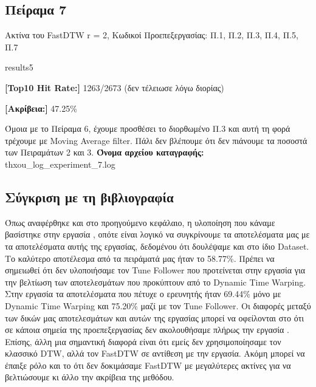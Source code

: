 \subsection{Πείραμα 7}
Ακτίνα του FastDTW r = 2, Κωδικοί Προεπεξεργασίας: Π.1, Π.2, Π.3, Π.4, Π.5, Π.7
\begin{labeling}{results5}
  \item \textbf{[Top10 Hit Rate:]} 1263/2673 (δεν τέλειωσε λόγω διορίας)
  \item \textbf{[Ακρίβεια:]} 47.25\%
\end{labeling}
Όμοια με το Πείραμα 6, έχουμε προσθέσει το διορθωμένο Π.3 και αυτή τη φορά τρέχουμε με Moving Average filter. Πάλι δεν βλέπουμε ότι δεν πιάνουμε τα ποσοστά των Πειραμάτων 2 και 3.
\textbf{Όνομα αρχείου καταγραφής:} thxou\_log\_experiment\_7.log

\subsection{Σύγκριση με τη βιβλιογραφία}
Όπως αναφέρθηκε και στο προηγούμενο κεφάλαιο, η υλοποίηση που κάναμε βασίστηκε στην εργασία \cite{stasiak2014follow}, οπότε είναι λογικό να συγκρίνουμε τα αποτελέσματα μας με τα αποτελέσματα αυτής της 
εργασίας, δεδομένου ότι δουλέψαμε και στο ίδιο Dataset. Το καλύτερο αποτέλεσμα από τα πειράματά μας ήταν το
58.77\%. Πρέπει να σημειωθεί ότι δεν υλοποιήσαμε τον Tune Follower που προτείνεται στην εργασία για την 
βελτίωση των αποτελεσμάτων που προκύπτουν από το Dynamic Time Warping. Στην εργασία τα αποτελέσματα που πέτυχε
ο ερευνητής ήταν 69.44\% μόνο με Dynamic Time Warping και 75.20\% μαζί με τον Tune Follower. Οι διαφορές 
μεταξύ των δικών μας αποτελεσμάτων και αυτών της εργασίας μπορεί να οφείλονται στο ότι σε κάποια σημεία της 
προεπεξεργασίας δεν ακολουθήσαμε πλήρως την εργασία \cite{stasiak2014follow}. Επίσης, άλλη μια σημαντική 
διαφορά είναι ότι εμείς δεν χρησιμοποίησαμε τον κλασσικό DTW, αλλά τον FastDTW σε αντίθεση με την εργασία. 
Ακόμη μπορεί να έπαιξε ρόλο και το ότι δεν δοκιμάσαμε FastDTW με μεγαλύτερες ακτίνες για να βελτιώσουμε κι άλλο την ακρίβεια της μεθόδου. 